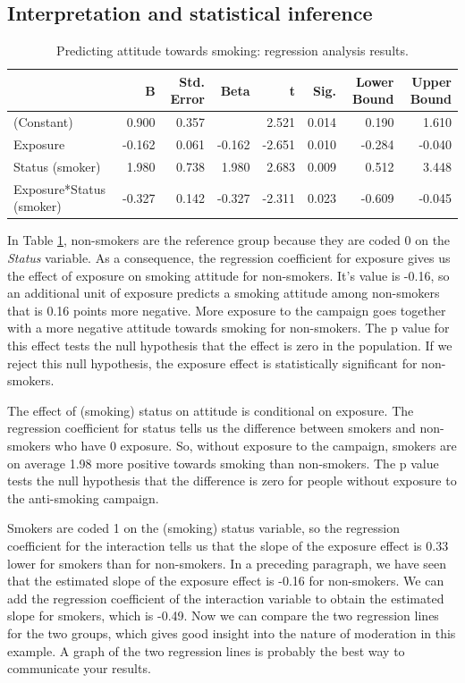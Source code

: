 \documentclass[a4paper]{book}
\theoremstyle{definition}
\theoremstyle{definition}
\theoremstyle{definition}
\theoremstyle{remark}
\begin{document}
\subsection{Interpretation and statistical
inference}\label{interactioninterpretation}

\begin{table}

\caption{\label{tab:dich-moderator-output}Predicting attitude towards smoking: regression analysis results.}
\centering
\fontsize{8}{8}\selectfont
\begin{tabular}[t]{lrrrrrrr}
\hline
  & B & Std. Error & Beta & t & Sig. & Lower Bound & Upper Bound\\
\hline
(Constant) & 0.900 & 0.357 &  & 2.521 & 0.014 & 0.190 & 1.610\\
Exposure & -0.162 & 0.061 & -0.162 & -2.651 & 0.010 & -0.284 & -0.040\\
Status (smoker) & 1.980 & 0.738 & 1.980 & 2.683 & 0.009 & 0.512 & 3.448\\
Exposure*Status (smoker) & -0.327 & 0.142 & -0.327 & -2.311 & 0.023 & -0.609 & -0.045\\
\hline
\end{tabular}
\end{table}

In Table \ref{tab:dich-moderator-output}, non-smokers are the reference
group because they are coded 0 on the \emph{Status} variable. As a
consequence, the regression coefficient for exposure gives us the effect
of exposure on smoking attitude for non-smokers. It's value is -0.16, so
an additional unit of exposure predicts a smoking attitude among
non-smokers that is 0.16 points more negative. More exposure to the
campaign goes together with a more negative attitude towards smoking for
non-smokers. The p value for this effect tests the null hypothesis that
the effect is zero in the population. If we reject this null hypothesis,
the exposure effect is statistically significant for non-smokers.

The effect of (smoking) status on attitude is conditional on exposure.
The regression coefficient for status tells us the difference between
smokers and non-smokers who have 0 exposure. So, without exposure to the
campaign, smokers are on average 1.98 more positive towards smoking than
non-smokers. The p value tests the null hypothesis that the difference
is zero for people without exposure to the anti-smoking campaign.

Smokers are coded 1 on the (smoking) status variable, so the regression
coefficient for the interaction tells us that the slope of the exposure
effect is 0.33 lower for smokers than for non-smokers. In a preceding
paragraph, we have seen that the estimated slope of the exposure effect
is -0.16 for non-smokers. We can add the regression coefficient of the
interaction variable to obtain the estimated slope for smokers, which is
-0.49. Now we can compare the two regression lines for the two groups,
which gives good insight into the nature of moderation in this example.
A graph of the two regression lines is probably the best way to
communicate your results.
\end{document}

